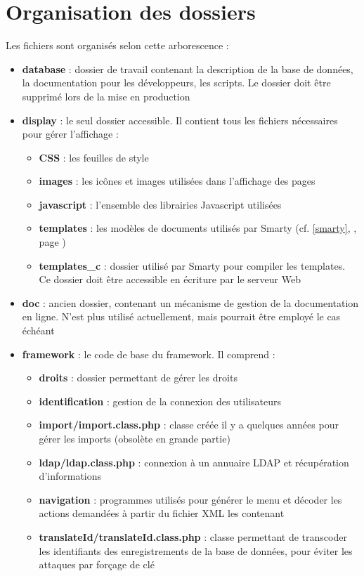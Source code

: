 \section{Organisation des dossiers}
Les fichiers sont organisés selon cette arborescence :
\begin{itemize}
\item \textbf{database} : dossier de travail contenant la description de la base de données, la documentation pour les développeurs, les scripts. Le dossier doit être supprimé lors de la mise en production
\item \textbf{display} : le seul dossier accessible. Il contient tous les fichiers nécessaires pour gérer l'affichage :
\begin{itemize}
\item \textbf{CSS} : les feuilles de style
\item \textbf{images} : les icônes et images utilisées dans l'affichage des pages
\item \textbf{javascript} : l'ensemble des librairies Javascript utilisées
\item \textbf{templates} : les modèles de documents utilisés par Smarty (cf. \ref{smarty}, \textit{}, page \pageref{smarty})
\item \textbf{templates\_c} : dossier utilisé par Smarty pour compiler les templates. Ce dossier doit être accessible en écriture par le serveur Web
\end{itemize}
\item \textbf{doc} : ancien dossier, contenant un mécanisme de gestion de la documentation en ligne. N'est plus utilisé actuellement, mais pourrait être employé le cas échéant
\item \textbf{framework} : le code de base du framework. Il comprend :
\begin{itemize}
\item \textbf{droits} : dossier permettant de gérer les droits 
\item \textbf{identification} : gestion de la connexion des utilisateurs
\item \textbf{import/import.class.php} : classe créée il y a quelques années pour gérer les imports (obsolète en grande partie)
\item \textbf{ldap/ldap.class.php} : connexion à un annuaire LDAP et récupération d'informations
\item \textbf{navigation} : programmes utilisés pour générer le menu et décoder les actions demandées à partir du fichier XML les contenant
\item \textbf{translateId/translateId.class.php} : classe permettant de transcoder les identifiants des enregistrements de la base de données, pour éviter les attaques par forçage de clé

\end{itemize}
\end{itemize}
